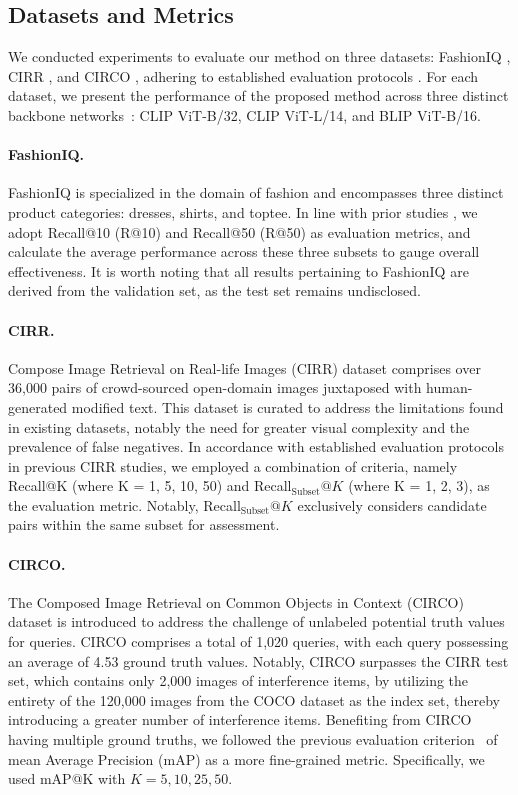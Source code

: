 \documentclass[10pt,twocolumn,letterpaper]{article}
\begin{document}
\subsection{Datasets and Metrics}
We conducted experiments to evaluate our method on three datasets: FashionIQ \cite{wu2021fashion}, CIRR \cite{liu2021image}, and CIRCO \cite{Baldrati_2023_ICCV}, adhering to established evaluation protocols \cite{baldrati2022effective}. For each dataset, we present the performance of the proposed method across three distinct backbone networks~\cite{radford2021clip, li2022blip}: CLIP ViT-B/32, CLIP ViT-L/14, and BLIP ViT-B/16.

\paragraph{FashionIQ.} FashionIQ \cite{wu2021fashion} is specialized in the domain of fashion and encompasses three distinct product categories: dresses, shirts, and toptee. In line with prior studies \cite{lee2021cosmo}, we adopt Recall@10 (R@10) and Recall@50 (R@50) as evaluation metrics, and calculate the average performance across these three subsets to gauge overall effectiveness. It is worth noting that all results pertaining to FashionIQ are derived from the validation set, as the test set remains undisclosed.

\paragraph{CIRR.} Compose Image Retrieval on Real-life Images (CIRR) \cite{liu2021image} dataset comprises over 36,000 pairs of crowd-sourced open-domain images juxtaposed with human-generated modified text. This dataset is curated to address the limitations found in existing datasets, notably the need for greater visual complexity and the prevalence of false negatives. In accordance with established evaluation protocols~\cite{liu2021image} in previous CIRR studies, we employed a combination of criteria, namely Recall@K (where K = 1, 5, 10, 50) and Recall$_{\text{Subset}}@K$ (where K = 1, 2, 3), as the evaluation metric. Notably, Recall$_{\text{Subset}}@K$ exclusively considers candidate pairs within the same subset for assessment.

\paragraph{CIRCO.} The Composed Image Retrieval on Common Objects in Context (CIRCO) \cite{Baldrati_2023_ICCV} dataset is introduced to address the challenge of unlabeled potential truth values for queries. CIRCO comprises a total of 1,020 queries, with each query possessing an average of 4.53 ground truth values. Notably, CIRCO surpasses the CIRR test set, which contains only 2,000 images of interference items, by utilizing the entirety of the 120,000 images from the COCO dataset \cite{lin2014microsoft} as the index set, thereby introducing a greater number of interference items. Benefiting from CIRCO having multiple ground truths, we followed the previous evaluation criterion~\cite{Baldrati_2023_ICCV} of mean Average Precision (mAP) as a more fine-grained metric. Specifically, we used mAP@K with $K= 5, 10, 25, 50$.
\end{document}
